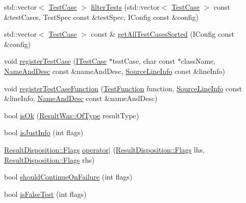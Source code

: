 \begin{DoxyCompactItemize}
std\+::vector$<$ \mbox{\hyperlink{class_catch_1_1_test_case}{Test\+Case}} $>$ \mbox{\hyperlink{namespace_catch_ab5da9aa67c42a3f626aea07d0b556829}{filter\+Tests}} (std\+::vector$<$ \mbox{\hyperlink{class_catch_1_1_test_case}{Test\+Case}} $>$ const \&test\+Cases, Test\+Spec const \&test\+Spec, I\+Config const \&config)
\item 
std\+::vector$<$ \mbox{\hyperlink{class_catch_1_1_test_case}{Test\+Case}} $>$ const  \& \mbox{\hyperlink{namespace_catch_a1c9b1a23bc947ea70ddaabf067276cf2}{get\+All\+Test\+Cases\+Sorted}} (I\+Config const \&config)
\item 
void \mbox{\hyperlink{namespace_catch_a9a59d681cc327a33c280796561dfe258}{register\+Test\+Case}} (\mbox{\hyperlink{struct_catch_1_1_i_test_case}{I\+Test\+Case}} $\ast$test\+Case, char const $\ast$class\+Name, \mbox{\hyperlink{struct_catch_1_1_name_and_desc}{Name\+And\+Desc}} const \&name\+And\+Desc, \mbox{\hyperlink{struct_catch_1_1_source_line_info}{Source\+Line\+Info}} const \&line\+Info)
\item 
void \mbox{\hyperlink{namespace_catch_a220159aeff47f9c5231e893f2abbc643}{register\+Test\+Case\+Function}} (\mbox{\hyperlink{namespace_catch_a26414f52d0835939fae52aadd27e6257}{Test\+Function}} function, \mbox{\hyperlink{struct_catch_1_1_source_line_info}{Source\+Line\+Info}} const \&line\+Info, \mbox{\hyperlink{struct_catch_1_1_name_and_desc}{Name\+And\+Desc}} const \&name\+And\+Desc)
\item 
bool \mbox{\hyperlink{namespace_catch_a5205869c81c06d3460759cb86676ae68}{is\+Ok}} (\mbox{\hyperlink{struct_catch_1_1_result_was_a624e1ee3661fcf6094ceef1f654601ef}{Result\+Was\+::\+Of\+Type}} result\+Type)
\item 
bool \mbox{\hyperlink{namespace_catch_a54b01af61673a3e1f21f31713639b180}{is\+Just\+Info}} (int flags)
\item 
\mbox{\hyperlink{struct_catch_1_1_result_disposition_a3396cad6e2259af326b3aae93e23e9d8}{Result\+Disposition\+::\+Flags}} \mbox{\hyperlink{namespace_catch_ab32a083e442cc09f736327d2e2865999}{operator$\vert$}} (\mbox{\hyperlink{struct_catch_1_1_result_disposition_a3396cad6e2259af326b3aae93e23e9d8}{Result\+Disposition\+::\+Flags}} lhs, \mbox{\hyperlink{struct_catch_1_1_result_disposition_a3396cad6e2259af326b3aae93e23e9d8}{Result\+Disposition\+::\+Flags}} rhs)
\item 
bool \mbox{\hyperlink{namespace_catch_a7f7480b15d74965459c844f0d393ed87}{should\+Continue\+On\+Failure}} (int flags)
\item 
bool \mbox{\hyperlink{namespace_catch_a93ef4e3e307a2021ca0d41b32c0e54b0}{is\+False\+Test}} (int flags)

\end{DoxyCompactItemize}

